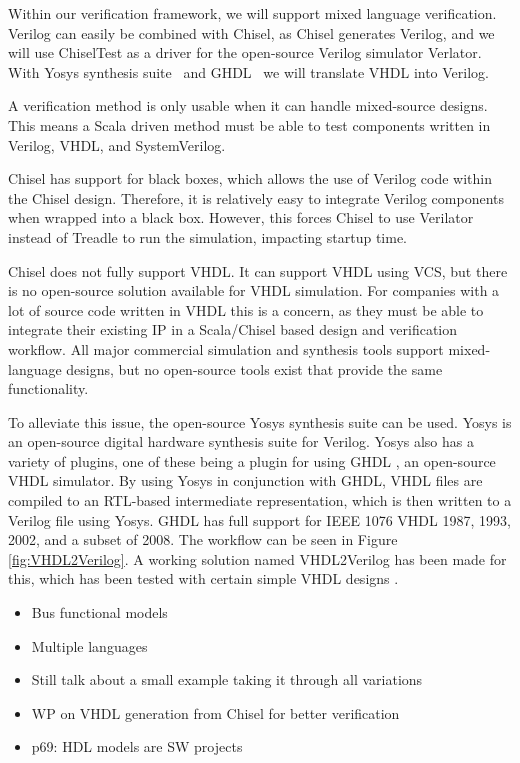 \documentclass[conference]{IEEEtran}
\begin{document}
Within our verification framework, we will support mixed language verification.
Verilog can easily be combined with Chisel, as Chisel generates Verilog, and
we will use ChiselTest as a driver for the open-source Verilog simulator Verlator.
With Yosys synthesis suite~\cite{Yosys} and GHDL~\cite{ghdl}
we will translate VHDL into Verilog.

A verification method is only usable when it can handle mixed-source designs.
This means a Scala driven method must be able to test components written in Verilog,
VHDL, and SystemVerilog.

Chisel has support for black boxes, which allows the use of Verilog code within the Chisel design.
Therefore, it is relatively easy to integrate Verilog components when wrapped into a black box.
However, this forces Chisel to use Verilator instead of Treadle to run the simulation, impacting
startup time.

Chisel does not fully support VHDL. It can support VHDL using VCS, but there is no
open-source solution available for VHDL simulation. For companies with a lot of source code written in VHDL this is a concern, as they must be able to integrate their existing IP in a Scala/Chisel based design and verification workflow.
All major commercial simulation and synthesis tools support mixed-language designs, but no open-source tools exist that provide the same functionality.

To alleviate this issue, the open-source Yosys synthesis suite \cite{Yosys} can be used. Yosys is an open-source digital hardware synthesis suite for Verilog. Yosys also has a variety of plugins, one of these being a plugin for using GHDL \cite{ghdl}, an open-source VHDL simulator. By using Yosys in conjunction with GHDL, VHDL files are compiled to an RTL-based intermediate representation, which is then written to a Verilog file using Yosys. GHDL has full support for IEEE 1076 VHDL 1987, 1993, 2002, and a subset of 2008. The workflow can be seen in Figure \ref{fig:VHDL2Verilog}. A working solution named VHDL2Verilog has been made for this, which has been tested with certain simple VHDL designs \cite{vhdl2verilog}.



\begin{itemize}
\item Bus functional models
\item Multiple languages
\item Still talk about a small example taking it through all variations
\item WP on VHDL generation from Chisel for better verification
\item p69: HDL models are SW projects
\end{itemize}
\end{document}
